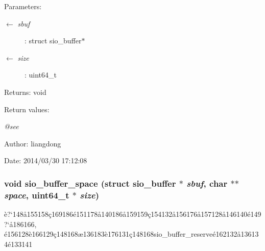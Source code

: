 \begin{Desc}
\item[Parameters:]
\begin{description}
\item[\mbox{$\leftarrow$} {\em sbuf}]: struct sio\_\-buffer$\ast$ \item[\mbox{$\leftarrow$} {\em size}]: uint64\_\-t \end{description}
\end{Desc}
\begin{Desc}
\item[Returns:]void \end{Desc}
\begin{Desc}
\item[Return values:]
\begin{description}
\item[{\em @see}]\end{description}
\end{Desc}
\begin{Desc}
\item[Author:]liangdong \end{Desc}
\begin{Desc}
\item[Date:]2014/03/30 17:12:08 \end{Desc}
\subsubsection{\setlength{\rightskip}{0pt plus 5cm}void sio\_\-buffer\_\-space (struct sio\_\-buffer $\ast$ {\em sbuf}, char $\ast$$\ast$ {\em space}, uint64\_\-t $\ast$ {\em size})}\label{sio__buffer_8c_a10}


\`{e}?`148\aa{}155158\c{c}169186\'{e}151178\aa{}140186\aa{}159159\c{c}154132\aa{}156176\aa{}157128\aa{}146140\'{e}149?`\aa{}186166, \'{e}156128\`{e}166129\c{c}148168\ae{}136183\`{e}176131\c{c}148168sio\_\-buffer\_\-reserve\'{e}162132\aa{}136134\'{e}133141 


